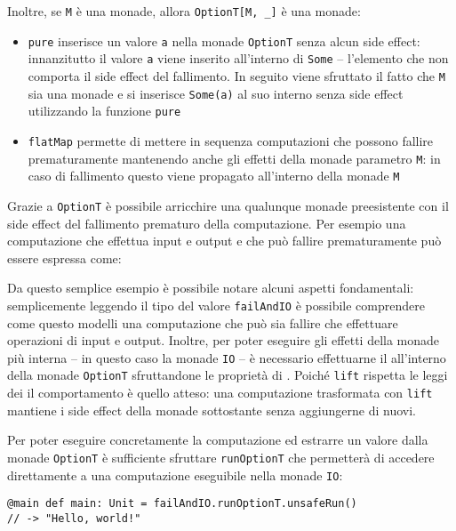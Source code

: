 Inoltre, se \lstinline{M} è una monade, allora \lstinline{OptionT[M, _]} è una monade:
\begin{itemize}
  \item \lstinline{pure} inserisce un valore \lstinline{a} nella monade \lstinline{OptionT} senza alcun side effect: innanzitutto il valore \lstinline{a} viene inserito all'interno di \lstinline{Some} -- l'elemento che non comporta il side effect del fallimento. In seguito viene sfruttato il fatto che \lstinline{M} sia una monade e si inserisce \lstinline{Some(a)} al suo interno senza side effect utilizzando la funzione \lstinline{pure}
  \item \lstinline{flatMap} permette di mettere in sequenza computazioni che possono fallire prematuramente mantenendo anche gli effetti della monade parametro \lstinline{M}: in caso di fallimento questo viene propagato all'interno della monade \lstinline{M}
\end{itemize}

Grazie a \lstinline{OptionT} è possibile arricchire una qualunque monade preesistente con il side effect del fallimento prematuro della computazione. Per esempio una computazione che effettua input e output e che può fallire prematuramente può essere espressa come:

Da questo semplice esempio è possibile notare alcuni aspetti fondamentali: semplicemente leggendo il tipo del valore \lstinline{failAndIO} è possibile comprendere come questo modelli una computazione che può sia fallire che effettuare operazioni di input e output. Inoltre, per poter eseguire gli effetti della monade più interna -- in questo caso la monade \lstinline{IO} -- è necessario effettuarne il  all'interno della monade \lstinline{OptionT} sfruttandone le proprietà di . Poiché \lstinline{lift} rispetta le leggi dei  il comportamento è quello atteso: una computazione trasformata con \lstinline{lift} mantiene i side effect della monade sottostante senza aggiungerne di nuovi.

Per poter eseguire concretamente la computazione ed estrarre un valore dalla monade \lstinline{OptionT} è sufficiente sfruttare \lstinline{runOptionT} che permetterà di accedere direttamente a una computazione eseguibile nella monade \lstinline{IO}:
\begin{lstlisting}[language=scala3]
@main def main: Unit = failAndIO.runOptionT.unsafeRun()
// -> "Hello, world!"
\end{lstlisting}

